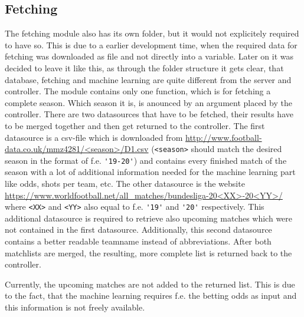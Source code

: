 \subsection{Fetching}
The fetching module also has its own folder, but it would not explicitely required to have so. This is due to a earlier development time, when the required data for fetching was downloaded as file and not directly into a variable. Later on it was decided to leave it like this, as through the folder structure it gets clear, that database, fetching and machine learning are quite different from the server and controller. The module contains only one function, which is for fetching a complete season. Which season it is, is anounced by an argument placed by the controller. There are two datasources that have to be fetched, their results have to be merged together and then get returned to the controller. The first datasource is a csv-file which is downloaded from \url{http://www.football-data.co.uk/mmz4281/<season>/D1.csv} (\lstinline[columns=fixed]{<season>} should match the desired season in the format of f.e. \lstinline[columns=fixed]{'19-20'}) and contains every finished match of the season with a lot of additional information needed for the machine learning part like odds, shots per team, etc.
The other datasource is the website \url{https://www.worldfootball.net/all_matches/bundesliga-20<XX>-20<YY>/} where \lstinline[columns=fixed]{<XX>} and \lstinline[columns=fixed]{<YY>} also equal to f.e. \lstinline[columns=fixed]{'19'} and \lstinline[columns=fixed]{'20'} respectively. This additional datasource is required to retrieve also upcoming matches which were not contained in the first datasource. Additionally, this second datasource contains a better readable teamname instead of abbreviations.
After both matchlists are merged, the resulting, more complete list is returned back to the controller.

Currently, the upcoming matches are not added to the returned list. This is due to the fact, that the machine learning requires f.e. the betting odds as input and this information is not freely available. %

